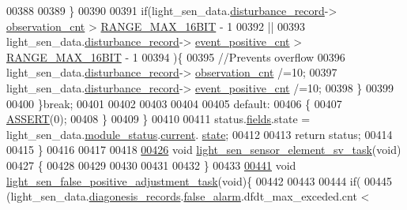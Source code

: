 \begin{DoxyCode}
00388 
00389              \}
00390 
00391              \textcolor{keywordflow}{if}(light\_sen\_data.\hyperlink{a00024_ac9b38e2c1d3f1013a88d33506c754152}{disturbance\_record}->
      \hyperlink{a00028_ad5b0bac02ce266b91b2b52a1c3ea1d78}{observation\_cnt} > \hyperlink{a00021_ae01726ef8ba0a9e1fe8655dc382ecda8}{RANGE\_MAX\_16BIT} - 1
00392                 ||
00393                 light\_sen\_data.\hyperlink{a00024_ac9b38e2c1d3f1013a88d33506c754152}{disturbance\_record}->
      \hyperlink{a00028_a7397b9d76d4b57500f27bb23d258a18a}{event\_positive\_cnt} > \hyperlink{a00021_ae01726ef8ba0a9e1fe8655dc382ecda8}{RANGE\_MAX\_16BIT} - 1
00394                 )\{
00395              \textcolor{comment}{//Prevents overflow}
00396               light\_sen\_data.\hyperlink{a00024_ac9b38e2c1d3f1013a88d33506c754152}{disturbance\_record}->
      \hyperlink{a00028_ad5b0bac02ce266b91b2b52a1c3ea1d78}{observation\_cnt}    /=10;
00397               light\_sen\_data.\hyperlink{a00024_ac9b38e2c1d3f1013a88d33506c754152}{disturbance\_record}->
      \hyperlink{a00028_a7397b9d76d4b57500f27bb23d258a18a}{event\_positive\_cnt} /=10;
00398              \}
00399 
00400         \}\textcolor{keywordflow}{break};
00401 
00402 
00403 
00404 
00405         \textcolor{keywordflow}{default}:
00406         \{
00407             \hyperlink{a00072_abb8ff8e213ac9f6fb21d2b968583b936}{ASSERT}(0);
00408         \}
00409     \}
00410 
00411   status.\hyperlink{a00021_a5296d090c085b0421fdf5a86e382abea}{fields}.state = light\_sen\_data.\hyperlink{a00024_a5a53c391562b059eb744ac679f3765ca}{module\_status}.\hyperlink{a00017_ab8af48cdbba92b3ae39c4470e53af944}{current}.
      \hyperlink{a00017_a6b8d8e916bc56265a3fd279bd26b6d1b}{state};
00412 
00413   \textcolor{keywordflow}{return} status;
00414 
00415 \}
00416 
00417 
00418 
\hypertarget{a00047_source_l00426}{}\hyperlink{a00047_ae68a20cad10654012eae75a1941f53db}{00426} \textcolor{keywordtype}{void} \hyperlink{a00047_ae68a20cad10654012eae75a1941f53db}{light\_sen\_sensor\_element\_sv\_task}(\textcolor{keywordtype}{void})
00427 \{
00428 
00429 
00430 
00431 
00432 \}
00433 
\hypertarget{a00047_source_l00441}{}\hyperlink{a00047_a05bd338db50fc948cf13db4f250894da}{00441} \textcolor{keywordtype}{void} \hyperlink{a00047_a05bd338db50fc948cf13db4f250894da}{light\_sen\_false\_positive\_adjustment\_task}(\textcolor{keywordtype}{void})\{
00442 
00443 
00444     \textcolor{keywordflow}{if}(
00445      (light\_sen\_data.\hyperlink{a00024_a7ae905b560513ad201e58c2f63375030}{diagonesis\_records}.\hyperlink{a00017_a799f50625c0c03f9404a59287810113d}{false\_alarm}.dfdt\_max\_exceded.cnt < 

\end{DoxyCode}
